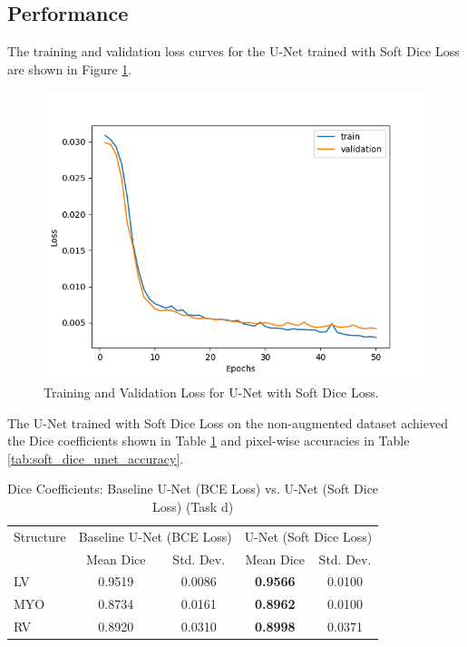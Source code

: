 \documentclass{article}
\begin{document}
\subsection{Performance}
The training and validation loss curves for the U-Net trained with Soft Dice Loss are shown in Figure \ref{fig:soft_dice_loss_curve}.
\begin{figure}[H]
  \centering
  \includegraphics[width=0.8\linewidth]{../result/soft_dice_loss.png}
  \caption{Training and Validation Loss for U-Net with Soft Dice Loss.}
  \label{fig:soft_dice_loss_curve}
\end{figure}

The U-Net trained with Soft Dice Loss on the non-augmented dataset achieved the Dice coefficients shown in Table \ref{tab:soft_dice_unet_comparison} and pixel-wise accuracies in Table \ref{tab:soft_dice_unet_accuracy}.
\begin{table}[H]
  \centering
  \caption{Dice Coefficients: Baseline U-Net (BCE Loss) vs. U-Net (Soft Dice Loss) (Task d)}
  \label{tab:soft_dice_unet_comparison}
  \begin{tabular}{l|cc|cc}
    \toprule
    Structure & \multicolumn{2}{c|}{Baseline U-Net (BCE Loss)} & \multicolumn{2}{c}{U-Net (Soft Dice Loss)}                               \\
              & Mean Dice                                      & Std. Dev.                                  & Mean Dice       & Std. Dev. \\
    \midrule
    LV        & 0.9519                                         & 0.0086                                     & \textbf{0.9566} & 0.0100    \\
    MYO       & 0.8734                                         & 0.0161                                     & \textbf{0.8962} & 0.0100    \\
    RV        & 0.8920                                         & 0.0310                                     & \textbf{0.8998} & 0.0371    \\
    \bottomrule
  \end{tabular}
\end{table}
\end{document}
